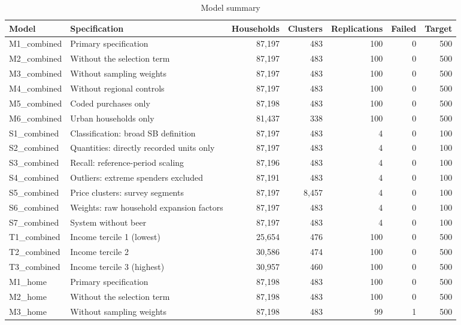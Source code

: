 \documentclass[
  11pt,
]{article}
\begin{document}
\clearpage

\begin{table}[!htbp]
\centering
\begin{threeparttable}
\caption{Model summary}
\label{tab:models}
\scriptsize
\begin{tabular}{lp{5.2cm}rrrrr}
\toprule
Model & Specification & Households & Clusters & Replications & Failed & Target \\
\midrule
M1\_combined & Primary specification & 87,197 & 483 & 100 & 0 & 500 \\
M2\_combined & Without the selection term & 87,197 & 483 & 100 & 0 & 500 \\
M3\_combined & Without sampling weights & 87,197 & 483 & 100 & 0 & 500 \\
M4\_combined & Without regional controls & 87,197 & 483 & 100 & 0 & 500 \\
M5\_combined & Coded purchases only & 87,198 & 483 & 100 & 0 & 500 \\
M6\_combined & Urban households only & 81,437 & 338 & 100 & 0 & 500 \\
S1\_combined & Classification: broad SB definition & 87,197 & 483 & 4 & 0 & 100 \\
S2\_combined & Quantities: directly recorded units only & 87,197 & 483 & 4 & 0 & 100 \\
S3\_combined & Recall: reference-period scaling & 87,196 & 483 & 4 & 0 & 100 \\
S4\_combined & Outliers: extreme spenders excluded & 87,191 & 483 & 4 & 0 & 100 \\
S5\_combined & Price clusters: survey segments & 87,197 & 8,457 & 4 & 0 & 100 \\
S6\_combined & Weights: raw household expansion factors & 87,197 & 483 & 4 & 0 & 100 \\
S7\_combined & System without beer & 87,197 & 483 & 4 & 0 & 100 \\
T1\_combined & Income tercile 1 (lowest) & 25,654 & 476 & 100 & 0 & 500 \\
T2\_combined & Income tercile 2 & 30,586 & 474 & 100 & 0 & 500 \\
T3\_combined & Income tercile 3 (highest) & 30,957 & 460 & 100 & 0 & 500 \\
M1\_home & Primary specification & 87,198 & 483 & 100 & 0 & 500 \\
M2\_home & Without the selection term & 87,198 & 483 & 100 & 0 & 500 \\
M3\_home & Without sampling weights & 87,198 & 483 & 99 & 1 & 500 \\

\end{tabular}
\end{threeparttable}
\end{table}
\end{document}
